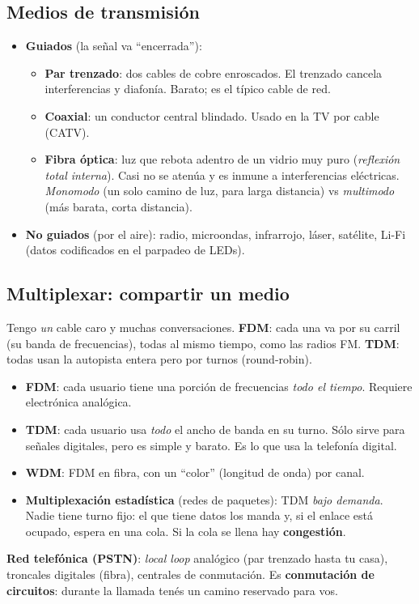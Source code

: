 \documentclass[10pt,a4paper]{article}
\newcommand{\term}[1]{\textbf{\color{azul}#1}}
\begin{document}
\subsection{Medios de transmisión}
\begin{itemize}
  \item \textbf{Guiados} (la señal va ``encerrada''):
    \begin{itemize}
      \item \term{Par trenzado}: dos cables de cobre enroscados. El trenzado cancela interferencias y diafonía. Barato; es el típico cable de red.
      \item \term{Coaxial}: un conductor central blindado. Usado en la TV por cable (CATV).
      \item \term{Fibra óptica}: luz que rebota adentro de un vidrio muy puro (\emph{reflexión total interna}). Casi no se atenúa y es inmune a interferencias eléctricas.
            \emph{Monomodo} (un solo camino de luz, para larga distancia) vs \emph{multimodo} (más barata, corta distancia).
    \end{itemize}
  \item \textbf{No guiados} (por el aire): radio, microondas, infrarrojo, láser, satélite, Li-Fi (datos codificados en el parpadeo de LEDs).
\end{itemize}

\subsection{Multiplexar: compartir un medio}
\begin{idea}
Tengo \emph{un} cable caro y muchas conversaciones. \textbf{FDM}: cada una va por su carril (su banda de frecuencias), todas al mismo tiempo, como las radios FM.
\textbf{TDM}: todas usan la autopista entera pero por turnos (round-robin).
\end{idea}
\begin{itemize}
  \item \term{FDM}: cada usuario tiene una porción de frecuencias \emph{todo el tiempo}. Requiere electrónica analógica.
  \item \term{TDM}: cada usuario usa \emph{todo} el ancho de banda en su turno. Sólo sirve para señales digitales, pero es simple y barato. Es lo que usa la telefonía digital.
  \item \term{WDM}: FDM en fibra, con un ``color'' (longitud de onda) por canal.
  \item \term{Multiplexación estadística} (redes de paquetes): TDM \emph{bajo demanda}. Nadie tiene turno fijo: el que tiene datos los manda y, si el enlace está ocupado, espera en una cola.
        Si la cola se llena hay \term{congestión}.
\end{itemize}
\textbf{Red telefónica (PSTN)}: \emph{local loop} analógico (par trenzado hasta tu casa), troncales digitales (fibra), centrales de conmutación.
Es \term{conmutación de circuitos}: durante la llamada tenés un camino reservado para vos.
\end{document}
